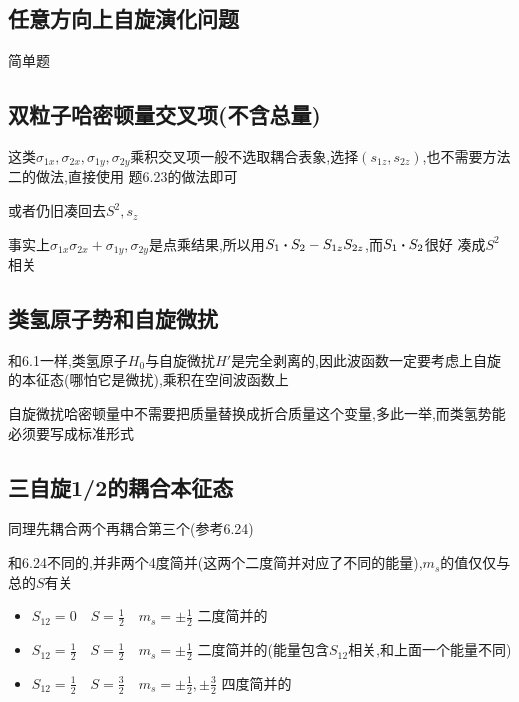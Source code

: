         \subsection{任意方向上自旋演化问题}
            简单题

        \subsection{双粒子哈密顿量交叉项(不含总量)}
            这类$\sigma_{1x},\sigma_{2x},\sigma_{1y},\sigma_{2y}$乘积交叉项一般不选取耦合表象,选择$(s_{1z},s_{2z})$,也不需要方法二的做法,直接使用
            题6.23的做法即可

            或者仍旧凑回去$S^{2},s_{z}$

            事实上$\sigma_{1x}\sigma_{2x}+\sigma_{1y},\sigma_{2y}$是点乘结果,所以用$S_{1} \vdot S_{2} - S_{1z}S_{2z}$,而$S_{1} \vdot S_{2}$很好
            凑成$S^{2}$相关

        \subsection{类氢原子势和自旋微扰}
            和6.1一样,类氢原子$H_0$与自旋微扰$H'$是完全剥离的,因此波函数一定要考虑上自旋的本征态(哪怕它是微扰),乘积在空间波函数上

            自旋微扰哈密顿量中不需要把质量替换成折合质量这个变量,多此一举,而类氢势能必须要写成标准形式

        \subsection{三自旋1/2的耦合本征态}
            同理先耦合两个再耦合第三个(参考6.24)

            和6.24不同的,并非两个4度简并(这两个二度简并对应了不同的能量),$m_{s}$的值仅仅与总的$S$有关

            \begin{itemize}
                \item $S_{12} = 0 \quad S = \frac{1}{2} \quad m_{s} = \pm \frac{1}{2}$ 二度简并的
                \item $S_{12} = \frac{1}{2} \quad S = \frac{1}{2} \quad m_{s} = \pm \frac{1}{2}$ 二度简并的(能量包含$S_{12}$相关,和上面一个能量不同)
                \item $S_{12} = \frac{1}{2} \quad S = \frac{3}{2} \quad m_{s} = \pm \frac{1}{2},\pm \frac{3}{2}$ 四度简并的
            \end{itemize}

